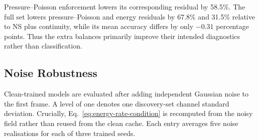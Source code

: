 \documentclass[preprint,12pt]{elsarticle}
\begin{document}
\begin{table}[htbp]
\centering
\caption{Effect of artifact-derived relations in the low-enstrophy group
(three seeds). Lower residuals are better.}
\label{tab:equation-ablation}
\end{table}

Pressure--Poisson enforcement lowers its corresponding residual by 58.5\%.
The full set lowers pressure--Poisson and energy residuals by 67.8\% and 31.5\%
relative to NS plus continuity, while its mean accuracy differs by only
$-0.31$ percentage points. Thus the extra balances primarily improve their
intended diagnostics rather than classification.

\subsection{Noise Robustness}
\label{sec:noise-robustness}

Clean-trained models are evaluated after adding independent Gaussian noise to
the first frame. A level of one denotes one discovery-set channel standard
deviation. Crucially, Eq.~\eqref{eq:energy-rate-condition} is recomputed from
the noisy field rather than reused from the clean cache. Each entry averages
five noise realisations for each of three trained seeds.

\begin{table}[htbp]
\centering
\caption{Trajectory-disjoint accuracy (\%) under test-time observation noise.}
\label{tab:noise-prediction}
\end{table}
\end{document}
